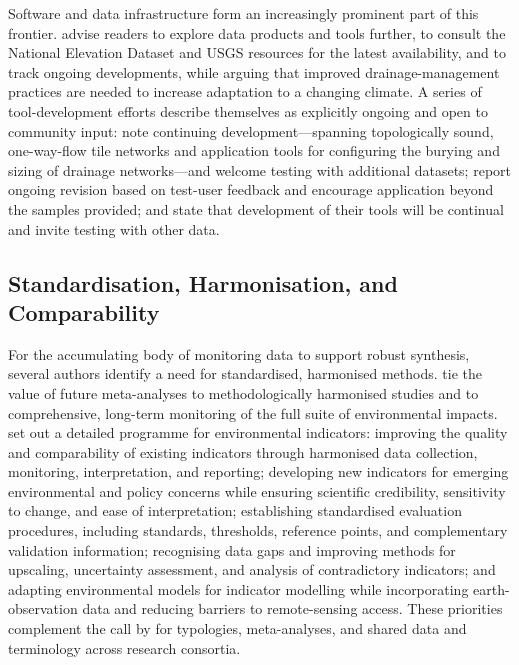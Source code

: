 Software and data infrastructure form an increasingly prominent part of this frontier. \textcite{Shedekar2018} advise readers to explore data products and tools further, to consult the National Elevation Dataset and USGS resources for the latest availability, and to track ongoing developments, while arguing that improved drainage-management practices are needed to increase adaptation to a changing climate. A series of tool-development efforts describe themselves as explicitly ongoing and open to community input: \textcite{Falasy2025} note continuing development---spanning topologically sound, one-way-flow tile networks and application tools for configuring the burying and sizing of drainage networks---and welcome testing with additional datasets; \textcite{Falasy2025b} report ongoing revision based on test-user feedback and encourage application beyond the samples provided; and \textcite{Falasy2024} state that development of their tools will be continual and invite testing with other data.

\subsection{Standardisation, Harmonisation, and Comparability}

For the accumulating body of monitoring data to support robust synthesis, several authors identify a need for standardised, harmonised methods. \textcite{Wu2025} tie the value of future meta-analyses to methodologically harmonised studies and to comprehensive, long-term monitoring of the full suite of environmental impacts. \textcite{Zhang2018} set out a detailed programme for environmental indicators: improving the quality and comparability of existing indicators through harmonised data collection, monitoring, interpretation, and reporting; developing new indicators for emerging environmental and policy concerns while ensuring scientific credibility, sensitivity to change, and ease of interpretation; establishing standardised evaluation procedures, including standards, thresholds, reference points, and complementary validation information; recognising data gaps and improving methods for upscaling, uncertainty assessment, and analysis of contradictory indicators; and adapting environmental models for indicator modelling while incorporating earth-observation data and reducing barriers to remote-sensing access. These priorities complement the call by \textcite{Rogger2017} for typologies, meta-analyses, and shared data and terminology across research consortia.

